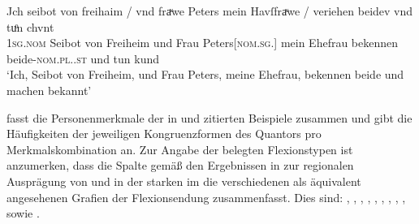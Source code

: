 \begin{exe}
\ex \label{ex:beid2coordncao2}

		\gll Jch seibot von freihaim / vnd fraͮwe Peters mein
			Havſfraͮwe / veriehen beidev vnd tuͦn chvnt \\
			\textsc{1sg\subM.nom} Seibot von Freiheim {} und Frau
			Peters[\textsc{nom.sg.\FemF}] mein Ehefrau {} bekennen
			beide-\textsc{nom.pl.\NeutMF.st} und tun kund \\
		\trans `Ich, Seibot von Freiheim, und Frau Peters, meine Ehefrau,
			bekennen beide und machen bekannt'
			\parencites(Nr.~3248, München, 1299)[416,23]{cao4}

\end{exe}

 fasst die Personenmerkmale der in
 und  zitierten Beispiele
zusammen und gibt die Häufigkeiten der jeweiligen Kongruenzformen
des Quantors pro Merkmalskombination an. Zur Angabe der belegten Flexionstypen
ist anzumerken, dass die Spalte  gemäß den Ergebnissen in
 zur regionalen Ausprägung von  und 
in der starken  im \CAO{} die verschiedenen als
äquivalent angesehenen Grafien der Flexionsendung zusammenfasst. Dies sind:
,
,
,
,
,
,
,
,
,
sowie
.

